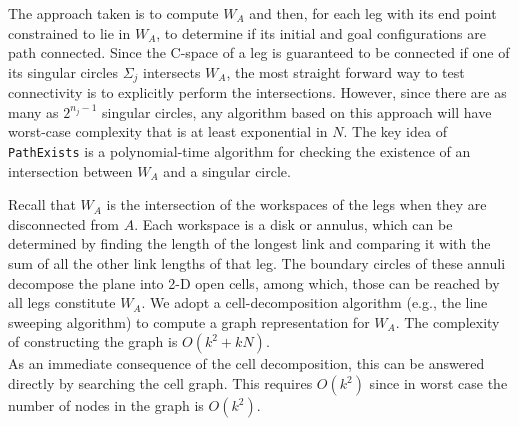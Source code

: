 \documentclass[twocolumn]{IEEEtran}
\begin{document}
The approach taken is to compute $W_A$ and then, for each leg with
its end point constrained to lie in $W_A$, to determine if its
initial and goal configurations are path connected.  Since the
C-space of a leg is guaranteed to be connected if one of its
singular circles $\Sigma_j$ intersects $W_A$, the most straight
forward way to test connectivity is to explicitly perform the
intersections.  However, since there are as many as $2^{n_j-1}$
singular circles, any algorithm based on this approach will have
worst-case complexity that is at least exponential in $N$. The key
idea of {\tt PathExists} is a polynomial-time algorithm for checking
the existence of an intersection between $W_A$ and a singular
circle.

\medskip

\noindent {} Recall that $W_A$ is the
intersection of the workspaces of the legs when they are
disconnected from $A$.  Each workspace is a disk or annulus, which
can be determined by finding the length of the longest link and
comparing it with the sum of all the other link lengths of that leg.
 The boundary circles of these annuli decompose the plane into 2-D
open cells, among which, those can be reached by all legs constitute
$W_A$. We adopt a cell-decomposition algorithm (e.g., the line
sweeping algorithm) to compute a graph representation for $W_A$.
The complexity of constructing the graph is $O(k^2+kN)$.
\medskip \\
  As an immediate consequence of the cell decomposition,
this can be answered directly by searching the cell graph. This
requires $O(k^2)$ since in worst case the number of nodes in the
graph is $O(k^2)$.
\end{document}
